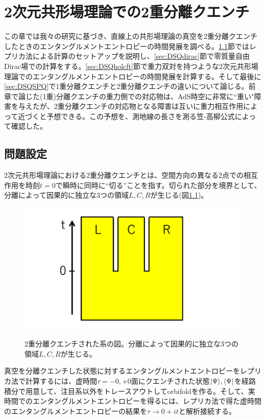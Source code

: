 \chapter{2次元共形場理論での2重分離クエンチ}\label{chap:doublequench}
この章では我々の研究\cite{Caputa:2019avh}に基づき、直線上の共形場理論の真空を2重分離クエンチしたときのエンタングルメントエントロピーの時間発展を調べる。\ref{sec:DSQsetup}節ではレプリカ法による計算のセットアップを説明し、\ref{sec:DSQdirac}節で零質量自由Dirac場での計算をする。\ref{sec:DSQholcft}節で重力双対を持つような2次元共形場理論でのエンタングルメントエントロピーの時間発展を計算する。そして最後に\ref{sec:DSQSPQ}で1重分離クエンチと2重分離クエンチの違いについて論じる。前章で論じた(1重)分離クエンチの重力側での対応物は、AdS時空に非常に``重い"障害を与えたが、2重分離クエンチの対応物となる障害は互いに重力相互作用によって近づくと予想できる。この予想を、測地線の長さを測る笠-高柳公式によって確認した。

\section{問題設定}\label{sec:DSQsetup}
2次元共形場理論における2重分離クエンチとは、空間方向の異なる2点での相互作用を時刻$t=0$で瞬時に同時に``切る''ことを指す。切られた部分を境界として、分離によって因果的に独立な3つの領域$L,C,R$が生じる(図\ref{fig:dqlorentz})。
\begin{figure}[h]
	\centering
	\includegraphics[width=0.7\linewidth]{DQlorentz.pdf}
	\label{fig:dqlorentz}
	\caption{2重分離クエンチされた系の図。分離によって因果的に独立な3つの領域$L,C,R$が生じる。}
\end{figure}

真空を分離クエンチした状態に対するエンタングルメントエントロピーをレプリカ法で計算するには、虚時間$\tau=-0,+0$面にクエンチされた状態$|\Psi\rangle, \langle\Psi|$を経路積分で用意して、注目系以外をトレースアウトしてorbifoldを作る。そして、実時間でのエンタングルメントエントロピーを得るには、レプリカ法で得た虚時間のエンタングルメントエントロピーの結果を$\tau\to 0+it$と解析接続する。


